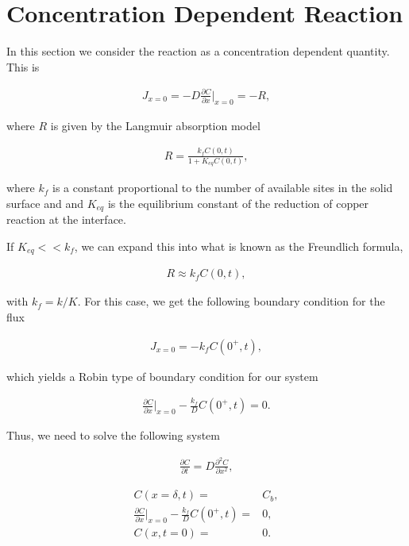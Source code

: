 \section{Concentration Dependent Reaction}
	
	In this section we consider the reaction as a concentration dependent quantity. This is
	
	
	\begin{align}
		J_{x=0} = -D\frac{\partial C}{\partial x}\big|_{x=0} = -R,
	\end{align}
	
	where $R$ is given by the Langmuir absorption model \cite{langmuir}
	
	\begin{align}
		R = \frac{k_fC(0, t)}{1 + K_{eq}C(0, t)},
	\end{align} 
	
	where $k_f$ is a constant proportional to the number of available sites in the solid surface and  and $K_{eq}$ is the equilibrium constant of the reduction of copper reaction at the interface.
	
	If $K_{eq} << k_f$, we can expand this into what is known as the Freundlich formula,
	
	\begin{align}
		R \approx k_f C(0, t),
	\end{align} 
	
	with $k_f = k/K$. For this case, we get the following boundary condition for the flux
	
	\begin{align}
		J_{x=0} = -k_fC(0^+,t),
	\end{align}
	
	which yields a Robin type of boundary condition for our system
	
	\begin{align}
		 \frac{\partial C}{\partial x}\big|_{x=0} -\frac{k_f}{D}C(0^+,t) = 0.
	\end{align}
	
	Thus, we need to solve the following system
	
		
	\begin{align}
		\frac{\partial C}{\partial t} = D \frac{\partial^2 C}{\partial x^2},
		\label{eq:dynamic-system-langmuir}
	\end{align}
	
	\begin{align}
		C(x = \delta, t) =& C_b,\\
		\frac{\partial C}{\partial x}\big|_{x=0} -\frac{k_f}{D}C(0^+,t) =& 0,\\
		C(x, t=0) =& 0.
		\label{eq:boundary-conditions-dynamic}
	\end{align}



